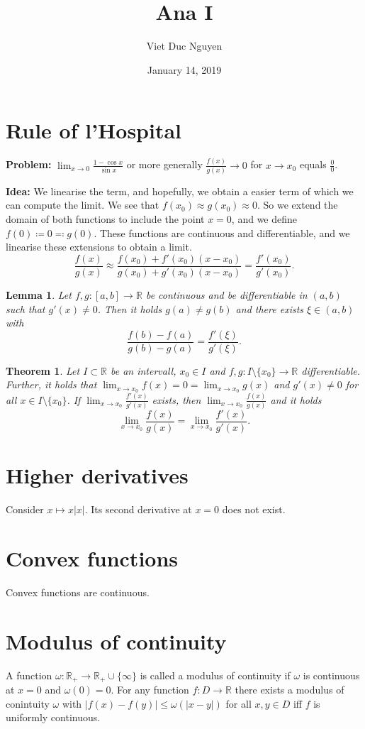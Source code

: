 \documentclass[a4paper, 11pt]{article}
\theoremstyle{plain}
\newtheorem*{theorem*}{Theorem}
\newtheorem*{lemma*}{Lemma}
\theoremstyle{definition}
\begin{document}
\title{Ana I}
\author{Viet Duc Nguyen}
\date{January 14, 2019}
\maketitle
\tableofcontents



\section{Rule of l'Hospital}
\textbf{Problem:} $\lim_{x \to 0} \frac{1- \cos x}{\sin x}$ or more generally $\frac{f(x)}{g(x)} \to 0$ for $x \to x_0$ equals $\frac{0}{0}$.

\textbf{Idea:} We linearise the term, and hopefully, we obtain a easier term of which we can compute the limit. We see that $f(x_0) \approx g(x_0) \approx 0$. So we extend the domain of both functions to include the point $x=0$, and we define $f(0) \coloneqq 0 \eqqcolon g(0)$. These functions are continuous and differentiable, and we  linearise these extensions to obtain a limit. $$\frac{f(x)}{g(x)} \approx \frac{f(x_0) + f'(x_0)(x-x_0)}{g(x_0) + g'(x_0)(x-x_0)} = \frac{f'(x_0)}{g'(x_0)}.$$

\begin{lemma*}
	Let $f,g: [a,b] \to \mathbb R$ be continuous and be differentiable in $(a,b)$ such that $g'(x) \neq 0$. Then it holds $g(a) \neq g(b)$ and there exists $\xi \in (a,b)$ with
	\[
		\frac{f(b) - f(a)}{g(b) - g(a)} = \frac{f'(\xi)}{g'(\xi)}.
	\]	
\end{lemma*}

\begin{theorem*}
	Let $I \subset \mathbb R$ be an intervall, $x_0 \in I$ and $f,g: I \setminus\{ x_0\} \to \mathbb R$ differentiable. Further, it holds that $\lim_{x \to x_0} f(x) = 0  = \lim_{x \to x_0} g(x)$ and $g'(x) \neq 0$ for all $x \in I \setminus\{x_0\}$. If $\lim_{x \to x_0} \frac{f'(x)}{g'(x)}$ exists, then $\lim_{x \to x_0} \frac{f(x)}{g(x)}$ and it holds
	\[
		\lim_{x \to x_0} \frac{f(x)}{g(x)} = \lim_{x \to x_0} \frac{f'(x)}{g'(x)}.
	\]
\end{theorem*}

\section{Higher derivatives}
Consider $x \mapsto x |x|$. Its second derivative at $x=0$ does not exist. 

\section{Convex functions}
Convex functions are continuous.

\section{Modulus of continuity}
A function $\omega: \mathbb R_{+} \to \mathbb R_{+} \cup \{ \infty \}$ is called a modulus of continuity if $\omega$ is continuous at $x = 0$ and $\omega(0) = 0$. For any function $f: D \to \mathbb R$ there exists a modulus of conintuity $\omega$ with $|f(x)-f(y)| \leq \omega(|x-y|)$ for all $x,y \in D$ iff $f$ is uniformly continuous. 
\end{document}

